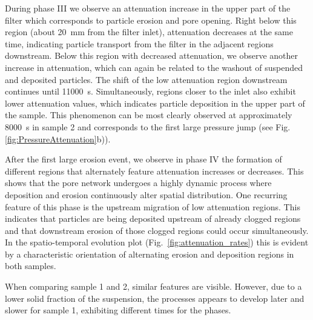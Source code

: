 \documentclass[smallextended]{svjour3}       %
\begin{document}
During phase III we observe an attenuation increase in the upper part of the filter which corresponds to particle erosion and pore opening. Right below this region (about 20~mm from the filter inlet), attenuation decreases at the same time, indicating particle transport from the filter in the adjacent regions downstream. Below this region with decreased attenuation, we observe another increase in attenuation, which can again be related to the washout of suspended and deposited particles. The shift of the low attenuation region downstream continues until 11000~s. Simultaneously, regions closer to the inlet also exhibit lower attenuation values, which indicates particle deposition in the upper part of the sample. This phenomenon can be most clearly observed at approximately 8000~s in sample 2 and corresponds to the first large pressure jump (see Fig. \ref{fig:PressureAttenuation}b)). 

After the first large erosion event, we observe in phase IV the formation of different regions that alternately feature attenuation increases or decreases. This shows that the pore network undergoes a highly dynamic process where deposition and erosion continuously alter spatial distribution. One recurring feature of this phase is the upstream migration of low attenuation regions. This indicates that particles are being deposited upstream of already clogged regions and that downstream erosion of those clogged regions could occur simultaneously. In the spatio-temporal evolution plot (Fig.~\ref{fig:attenuation_rates}) this is evident by a characteristic orientation of alternating erosion and deposition regions in both samples.

When comparing sample 1 and 2, similar features are visible. However, due to a lower solid fraction of the suspension, the processes appears to develop later and slower for sample 1, exhibiting different times for the phases. 
\end{document}
